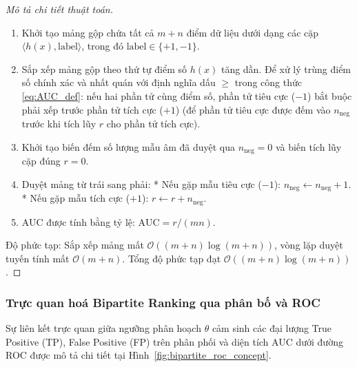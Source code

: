 \begin{proof}[Mô tả chi tiết thuật toán]
\begin{enumerate}
    \item Khởi tạo mảng gộp chứa tất cả $m + n$ điểm dữ liệu dưới dạng các cặp $\langle h(x), \text{label} \rangle$, trong đó $\text{label} \in \{+1, -1\}$.
    \item Sắp xếp mảng gộp theo thứ tự điểm số $h(x)$ tăng dần. Để xử lý trùng điểm số chính xác và nhất quán với định nghĩa dấu $\geq$ trong công thức \eqref{eq:AUC_def}: nếu hai phần tử cùng điểm số, phần tử tiêu cực ($-1$) bắt buộc phải xếp trước phần tử tích cực ($+1$) (để phần tử tiêu cực được đếm vào $n_{\text{neg}}$ trước khi tích lũy $r$ cho phần tử tích cực).
    \item Khởi tạo biến đếm số lượng mẫu âm đã duyệt qua $n_{\text{neg}} = 0$ và biến tích lũy cặp đúng $r = 0$.
    \item Duyệt mảng từ trái sang phải:
          * Nếu gặp mẫu tiêu cực ($-1$): $n_{\text{neg}} \leftarrow n_{\text{neg}} + 1$.
          * Nếu gặp mẫu tích cực ($+1$): $r \leftarrow r + n_{\text{neg}}$.
    \item AUC được tính bằng tỷ lệ: $\mathrm{AUC} = r / (mn)$.
\end{enumerate}
Độ phức tạp: Sắp xếp mảng mất $\mathcal{O}((m+n)\log(m+n))$, vòng lặp duyệt tuyến tính mất $\mathcal{O}(m+n)$. Tổng độ phức tạp đạt $\mathcal{O}((m+n)\log(m+n))$.
\end{proof}

\subsubsection{Trực quan hoá Bipartite Ranking qua phân bố và ROC}

Sự liên kết trực quan giữa ngưỡng phân hoạch $\theta$ cảm sinh các đại lượng True Positive (TP), False Positive (FP) trên phân phối và diện tích AUC dưới đường ROC được mô tả chi tiết tại Hình~\ref{fig:bipartite_roc_concept}.

